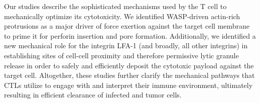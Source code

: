 Our studies describe the sophisticated mechanisms used by the T cell to mechanically optimize its cytotoxicity. We identified WASP-driven actin-rich protrusions as a major driver of force exertion against the target cell membrane to prime it for perforin insertion and pore formation. Additionally, we identified a new mechanical role for the integrin LFA-1 (and broadly, all other integrins) in establishing sites of cell-cell proximity and therefore permissive lytic granule release in order to safely and efficiently deposit the cytotoxic payload against the target cell. Altogether, these studies further clarify the mechanical pathways that CTLs utilize to engage with and interpret their immune environment, ultimately resulting in efficient clearance of infected and tumor cells.
